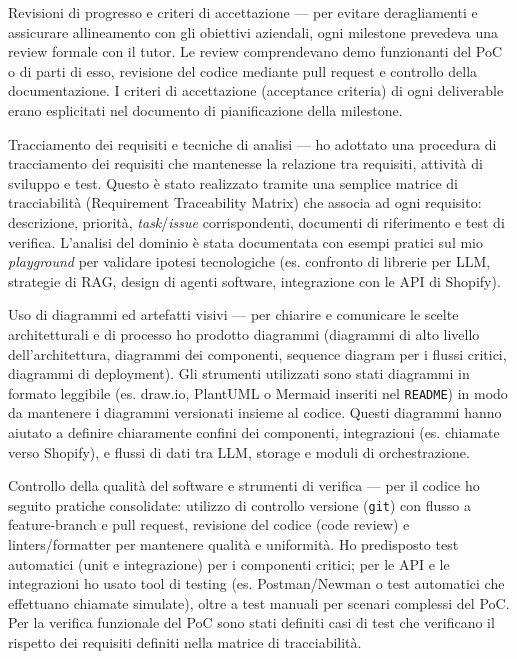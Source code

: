 Revisioni di progresso e criteri di accettazione — per evitare deragliamenti e assicurare allineamento con gli obiettivi aziendali, ogni milestone prevedeva una review formale con il tutor. 
Le review comprendevano demo funzionanti del PoC o di parti di esso, revisione del codice mediante pull request e controllo della documentazione. 
I criteri di accettazione (acceptance criteria) di ogni deliverable erano esplicitati nel documento di pianificazione della milestone.

Tracciamento dei requisiti e tecniche di analisi — ho adottato una procedura di tracciamento dei requisiti che mantenesse la relazione tra requisiti, attività di sviluppo e test. 
Questo è stato realizzato tramite una semplice matrice di tracciabilità (Requirement Traceability Matrix) che associa ad ogni requisito: descrizione, priorità, \emph{task}/\emph{issue} corrispondenti, 
documenti di riferimento e test di verifica. L'analisi del dominio è stata documentata con esempi pratici sul mio \emph{playground} per validare ipotesi tecnologiche
(es. confronto di librerie per LLM, strategie di RAG, design di agenti software, integrazione con le API di Shopify).

Uso di diagrammi ed artefatti visivi — per chiarire e comunicare le scelte architetturali e di processo ho prodotto diagrammi 
(diagrammi di alto livello dell'architettura, diagrammi dei componenti, sequence diagram per i flussi critici, diagrammi di deployment). 
Gli strumenti utilizzati sono stati diagrammi in formato leggibile (es. draw.io, PlantUML o Mermaid inseriti nel \texttt{README}) in modo da mantenere i diagrammi versionati insieme al codice. 
Questi diagrammi hanno aiutato a definire chiaramente confini dei componenti, integrazioni (es. chiamate verso Shopify), e flussi di dati tra LLM, storage e moduli di orchestrazione.

Controllo della qualità del software e strumenti di verifica — per il codice ho seguito pratiche consolidate: utilizzo di controllo versione 
(\texttt{git}) con flusso a feature-branch e pull request, revisione del codice (code review) e linters/formatter per mantenere qualità e uniformità. 
Ho predisposto test automatici (unit e integrazione) per i componenti critici; per le API e le integrazioni ho usato tool di testing 
(es. Postman/Newman o test automatici che effettuano chiamate simulate), oltre a test manuali per scenari complessi del PoC. 
Per la verifica funzionale del PoC sono stati definiti casi di test che verificano il rispetto dei requisiti definiti nella matrice di tracciabilità.


